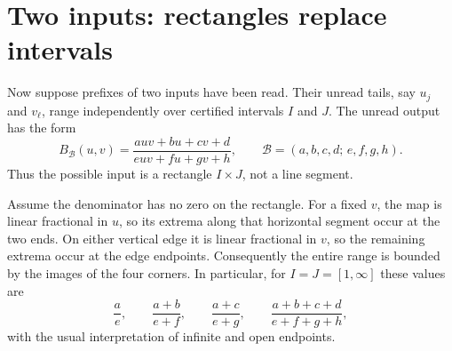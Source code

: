 \section{Two inputs: rectangles replace intervals}

Now suppose prefixes of two inputs have been read.  Their unread tails, say
$u_j$ and $v_\ell$, range independently over certified intervals $I$ and $J$.
The unread output has the form
\begin{equation}
 B_{\mathcal B}(u,v)
 =\frac{auv+bu+cv+d}{euv+fu+gv+h},
 \qquad
 \mathcal B=(a,b,c,d;\,e,f,g,h).                  \label{eq:bihomographic}
\end{equation}
Thus the possible input is a rectangle $I\times J$, not a line segment.

\begin{center}
\end{center}

Assume the denominator has no zero on the rectangle.  For a fixed $v$, the
map is linear fractional in $u$, so its extrema along that horizontal segment
occur at the two ends.  On either vertical edge it is linear fractional in
$v$, so the remaining extrema occur at the edge endpoints.  Consequently the
entire range is bounded by the images of the four corners.  In particular, for
$I=J=[1,\infty]$ these values are
\begin{equation}
 \frac ae,\qquad \frac{a+b}{e+f},\qquad
 \frac{a+c}{e+g},\qquad
 \frac{a+b+c+d}{e+f+g+h},                         \label{eq:four-corners}
\end{equation}
with the usual interpretation of infinite and open endpoints.

